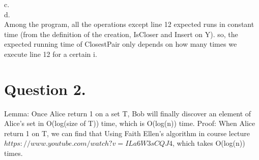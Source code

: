 \documentclass[a4paper]{article}
\begin{document}
c.\\



d.\\
Among the program, all the operations except line 12 expected runs in constant time (from the definition of the creation, IsCloser and Insert on Y). so, the expected running time of ClosestPair only depends on how many times we execute line 12 for a certain i.
\section{Question 2.}
Lemma: Once Alice return 1 on a set T, Bob will finally discover an element of Alice’s set in O(log(size of T)) time, which is O(log(n)) time.
Proof:
When Alice return 1 on T, we can find that Using Faith Ellen's algorithm in course lecture $https://www.youtube.com/watch?v=ILa6W3sCQJ4$, which takes O(log(n)) times.
\end{document}
